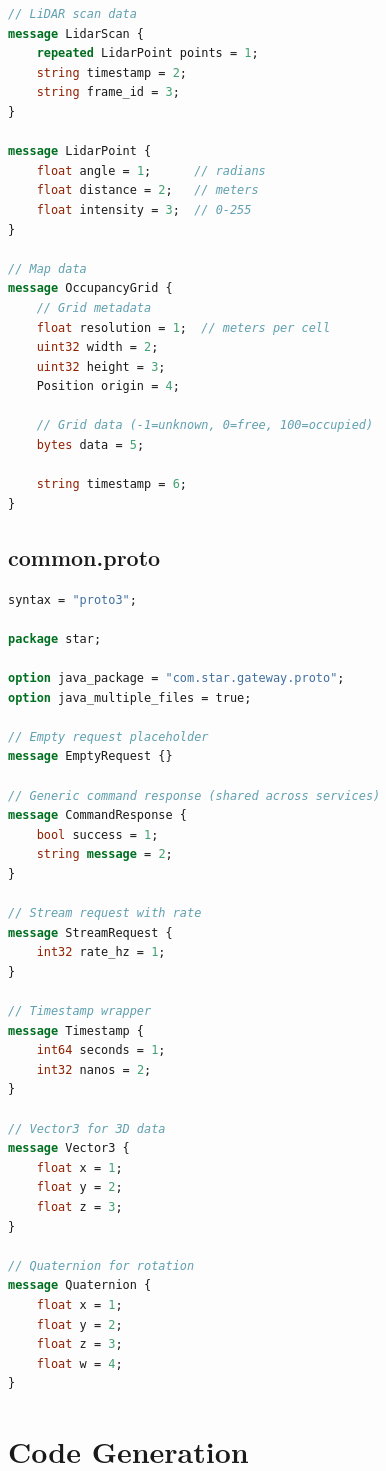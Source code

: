 \documentclass[11pt,letterpaper]{article}
\begin{document}
\begin{lstlisting}[language=Protobuf, caption=star/navigation.proto]
// LiDAR scan data
message LidarScan {
    repeated LidarPoint points = 1;
    string timestamp = 2;
    string frame_id = 3;
}

message LidarPoint {
    float angle = 1;      // radians
    float distance = 2;   // meters
    float intensity = 3;  // 0-255
}

// Map data
message OccupancyGrid {
    // Grid metadata
    float resolution = 1;  // meters per cell
    uint32 width = 2;
    uint32 height = 3;
    Position origin = 4;

    // Grid data (-1=unknown, 0=free, 100=occupied)
    bytes data = 5;

    string timestamp = 6;
}
\end{lstlisting}

\subsection{common.proto}

\begin{lstlisting}[language=Protobuf, caption=star/common.proto]
syntax = "proto3";

package star;

option java_package = "com.star.gateway.proto";
option java_multiple_files = true;

// Empty request placeholder
message EmptyRequest {}

// Generic command response (shared across services)
message CommandResponse {
    bool success = 1;
    string message = 2;
}

// Stream request with rate
message StreamRequest {
    int32 rate_hz = 1;
}

// Timestamp wrapper
message Timestamp {
    int64 seconds = 1;
    int32 nanos = 2;
}

// Vector3 for 3D data
message Vector3 {
    float x = 1;
    float y = 2;
    float z = 3;
}

// Quaternion for rotation
message Quaternion {
    float x = 1;
    float y = 2;
    float z = 3;
    float w = 4;
}
\end{lstlisting}

\section{Code Generation}
\end{document}
